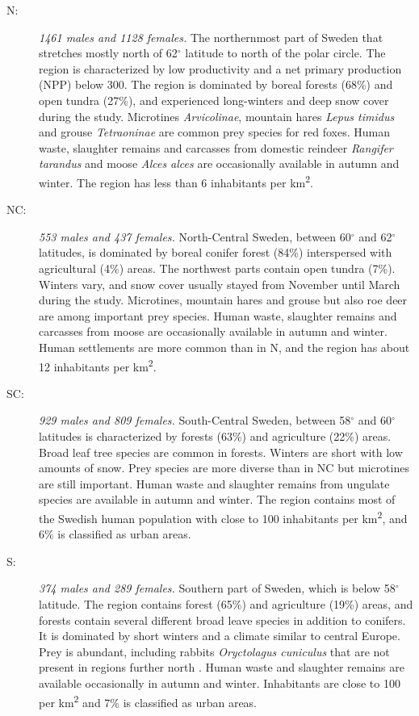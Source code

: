 \documentclass[12pt,a4paper,final,abstract=true,headings=small]{scrartcl}
\begin{document}
\begin{description}
  \item [N:] \emph{1461 males and 1128 females.} The northernmost part of Sweden that stretches mostly north of 62$^{\circ}$ latitude to north of the polar circle. The region is characterized by low productivity and a net primary production (NPP) below 300. The region is dominated by boreal forests (68\%) and open tundra (27\%), and experienced long-winters and deep snow cover during the study. Microtines \emph{Arvicolinae}, mountain hares \emph{Lepus timidus} and grouse \emph{Tetraoninae} are common prey species for red foxes. Human waste, slaughter remains and carcasses from domestic reindeer \emph{Rangifer tarandus} and moose \emph{Alces alces} are occasionally available in autumn and winter. The region has less than 6 inhabitants per km\textsuperscript{2}.

  \item [NC:] \emph{553 males and 437 females.} North-Central Sweden, between 60$^{\circ}$ and 62$^{\circ}$latitudes, is dominated by boreal conifer forest (84\%) interspersed with agricultural (4\%) areas. The northwest parts contain open tundra (7\%). Winters vary, and snow cover usually stayed from November until March during the study. Microtines, mountain hares and grouse but also roe deer are among important prey species. Human waste, slaughter remains and carcasses from moose are occasionally available in autumn and winter. Human settlements are more common than in N, and the region has about 12 inhabitants per km\textsuperscript{2}.

  \item [SC:] \emph{929 males and 809 females.} South-Central Sweden, between 58$^{\circ}$ and 60$^{\circ}$latitudes is characterized by forests (63\%) and agriculture (22\%) areas. Broad leaf tree species are common in forests. Winters are short with low amounts of snow. Prey species are more diverse than in NC but microtines are still important. Human waste and slaughter remains from ungulate species are available in autumn and winter. The region contains most of the Swedish human population with close to 100 inhabitants per km\textsuperscript{2}, and 6\% is classified as urban areas.

  \item [S:] \emph{374 males and 289 females.} Southern part of Sweden, which is below 58$^{\circ}$ latitude. The region contains forest (65\%) and agriculture (19\%) areas, and forests contain  several different broad leave species in addition to conifers. It is dominated by short winters and a climate similar to central Europe. Prey is abundant, including rabbits \emph{Oryctolagus cuniculus} that are not present in regions further north \citep{erlingeCanVertebratePredators1984}. Human waste and slaughter remains are available occasionally in autumn and winter. Inhabitants are close to 100 per km\textsuperscript{2} and 7\% is classified as urban areas.

\end{description}
\end{document}
